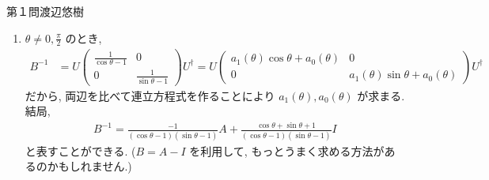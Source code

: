 \begin{answer}{第１問}{渡辺悠樹}
\begin{enumerate}
\begin{enumerate}
\begin{align*}
      &=U\begin{pmatrix}
        \cos\theta-1 & 0 \\
        0 & \sin\theta -1
      \end{pmatrix}U^\dag
    \end{align*}
    したがって $\det B = (\cos\theta-1)(\sin\theta-1)$ なので, $\theta=0,\frac\pi2$
  \item
    $\theta\neq0,\frac\pi2$ のとき,
    \begin{align*}
      B^{-1}
      &=U\begin{pmatrix}
        \frac1{\cos\theta-1} & 0 \\
        0 & \frac1{\sin\theta -1}
      \end{pmatrix}U^\dag
      =U\begin{pmatrix}
        a_1(\theta)\cos\theta +a_0(\theta) & 0 \\
        0 & a_1(\theta)\sin\theta +a_0(\theta)
      \end{pmatrix}U^\dag
    \end{align*}
    だから, 両辺を比べて連立方程式を作ることにより $a_1(\theta),a_0(\theta)$ が求まる. 結局, 
    \begin{align*}
      B^{-1} = \frac{-1}{(\cos\theta-1)(\sin\theta-1)}A
        + \frac{\cos\theta +\sin\theta+1}{(\cos\theta-1)(\sin\theta-1)} I
    \end{align*}
    と表すことができる. ($B=A-I$ を利用して, もっとうまく求める方法があるのかもしれません.)
  \end{enumerate}


\end{enumerate}
\end{answer}
